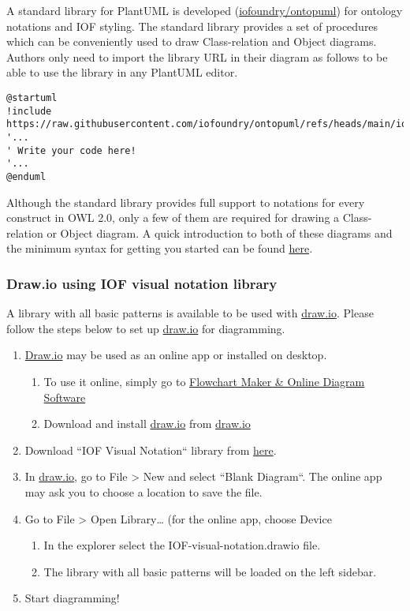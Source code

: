 A standard library for PlantUML is developed (\href{https://github.com/iofoundry/ontopuml}{iofoundry/ontopuml}) for ontology notations and IOF styling. The standard library provides a set of procedures which can be conveniently used to draw Class-relation and Object diagrams. Authors only need to import the library URL in their diagram as follows to be able to use the library in any PlantUML editor.  

\begin{verbatim}
@startuml
!include https://raw.githubusercontent.com/iofoundry/ontopuml/refs/heads/main/iof.iuml
'...
' Write your code here!
'...
@enduml
\end{verbatim}
Although the standard library provides full support to notations for every construct in OWL 2.0, only a few of them are required for drawing a Class-relation or Object diagram. A quick introduction to both of these diagrams and the minimum syntax for getting you started can be found \href{https://iofoundry.github.io/ontopuml/quick-diagram}{here}.



\subsubsection{Draw.io using IOF visual notation library}

A library with all basic patterns is available to be used with \href{http://draw.io/}{draw.io}. Please follow the steps below to set up \href{http://draw.io/}{draw.io} for diagramming.

\begin{enumerate}
    \item \href{http://draw.io/}{Draw.io} may be used as an online app or installed on desktop. 
    \begin{enumerate}
        \item To use it online, simply go to \href{https://app.diagrams.net/}{Flowchart Maker \& Online Diagram Software} 
        \item Download and install \href{http://draw.io/}{draw.io} from \href{https://www.drawio.com/}{draw.io} 
    \end{enumerate}
    \item Download “IOF Visual Notation“ library from \href{https://github.com/iofoundry/IOF-Core-Pattern-v2/blob/main/etc/IOF-visual-notation.drawio}{here}.
    \item In \href{http://draw.io/}{draw.io}, go to File > New and select “Blank Diagram“. The online app may ask you to choose a location to save the file. 
    \item Go to File > Open Library… (for the online app, choose Device 
    \begin{enumerate}
        \item In the explorer select the IOF-visual-notation.drawio file.
        \item The library with all basic patterns will be loaded on the left sidebar.
    \end{enumerate}
    \item Start diagramming!
\end{enumerate}

